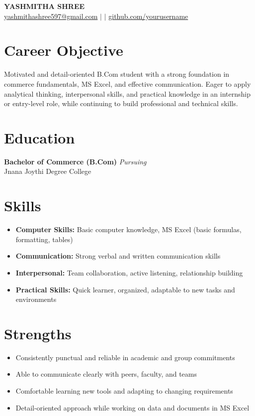 \documentclass[11pt,a4paper]{article}
\begin{document}
\begin{center}
    {\LARGE \textbf{YASHMITHA SHREE}}\\[4pt]
    \small
    \href{mailto:yashmithashree597@gmail.com}{yashmithashree597@gmail.com} \; $|$  \; $|$ \;
    \href{https://github.com/yourusername}{github.com/yourusername}
\end{center}

\vspace{2pt}

\section*{Career Objective}
Motivated and detail-oriented B.Com student with a strong foundation in commerce fundamentals, MS Excel, and effective communication. Eager to apply analytical thinking, interpersonal skills, and practical knowledge in an internship or entry-level role, while continuing to build professional and technical skills.

\section*{Education}
\textbf{Bachelor of Commerce (B.Com)} \hfill \textit{Pursuing} \\
Jnana Joythi Degree College

\section*{Skills}
\begin{itemize}
    \item \textbf{Computer Skills:} Basic computer knowledge, MS Excel (basic formulas, formatting, tables)
    \item \textbf{Communication:} Strong verbal and written communication skills
    \item \textbf{Interpersonal:} Team collaboration, active listening, relationship building
    \item \textbf{Practical Skills:} Quick learner, organized, adaptable to new tasks and environments
\end{itemize}

\section*{Strengths}
\begin{itemize}
    \item Consistently punctual and reliable in academic and group commitments
    \item Able to communicate clearly with peers, faculty, and teams
    \item Comfortable learning new tools and adapting to changing requirements
    \item Detail-oriented approach while working on data and documents in MS Excel
\end{itemize}
\end{document}
